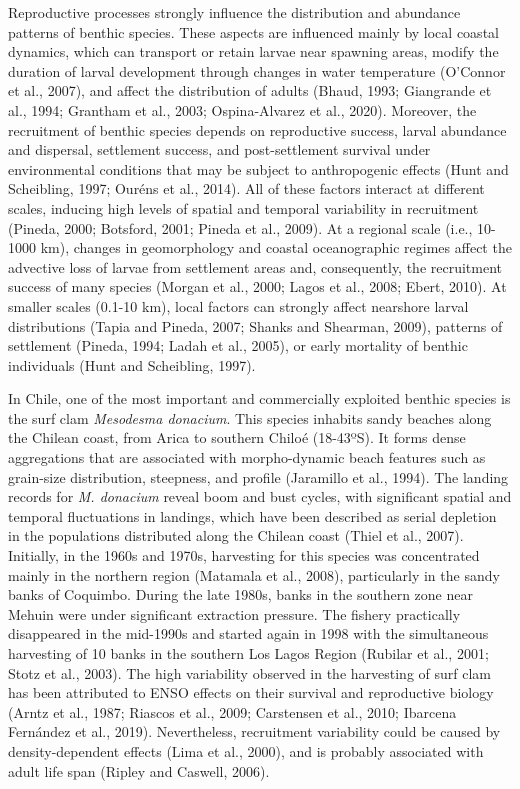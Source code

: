 \documentclass[12pt]{article}
\begin{document}
Reproductive processes strongly influence the distribution and abundance
patterns of benthic species. These aspects are influenced mainly by
local coastal dynamics, which can transport or retain larvae near
spawning areas, modify the duration of larval development through
changes in water temperature (O'Connor et al., 2007), and affect the
distribution of adults (Bhaud, 1993; Giangrande et al., 1994; Grantham
et al., 2003; Ospina-Alvarez et al., 2020). Moreover, the recruitment of
benthic species depends on reproductive success, larval abundance and
dispersal, settlement success, and post-settlement survival under
environmental conditions that may be subject to anthropogenic effects
(Hunt and Scheibling, 1997; Ouréns et al., 2014). All of these factors
interact at different scales, inducing high levels of spatial and
temporal variability in recruitment (Pineda, 2000; Botsford, 2001;
Pineda et al., 2009). At a regional scale (i.e., 10-1000 km), changes in
geomorphology and coastal oceanographic regimes affect the advective
loss of larvae from settlement areas and, consequently, the recruitment
success of many species (Morgan et al., 2000; Lagos et al., 2008; Ebert,
2010). At smaller scales (0.1-10 km), local factors can strongly affect
nearshore larval distributions (Tapia and Pineda, 2007; Shanks and
Shearman, 2009), patterns of settlement (Pineda, 1994; Ladah et al.,
2005), or early mortality of benthic individuals (Hunt and Scheibling,
1997).

In Chile, one of the most important and commercially exploited benthic
species is the surf clam \emph{Mesodesma donacium}. This species
inhabits sandy beaches along the Chilean coast, from Arica to southern
Chiloé (18-43ºS). It forms dense aggregations that are associated with
morpho-dynamic beach features such as grain-size distribution,
steepness, and profile (Jaramillo et al., 1994). The landing records for
\emph{M. donacium} reveal boom and bust cycles, with significant spatial
and temporal fluctuations in landings, which have been described as
serial depletion in the populations distributed along the Chilean coast
(Thiel et al., 2007). Initially, in the 1960s and 1970s, harvesting for
this species was concentrated mainly in the northern region (Matamala et
al., 2008), particularly in the sandy banks of Coquimbo. During the late
1980s, banks in the southern zone near Mehuin were under significant
extraction pressure. The fishery practically disappeared in the
mid-1990s and started again in 1998 with the simultaneous harvesting of
10 banks in the southern Los Lagos Region (Rubilar et al., 2001; Stotz
et al., 2003). The high variability observed in the harvesting of surf
clam has been attributed to ENSO effects on their survival and
reproductive biology (Arntz et al., 1987; Riascos et al., 2009;
Carstensen et al., 2010; Ibarcena Fernández et al., 2019). Nevertheless,
recruitment variability could be caused by density-dependent effects
(Lima et al., 2000), and is probably associated with adult life span
(Ripley and Caswell, 2006).
\end{document}
